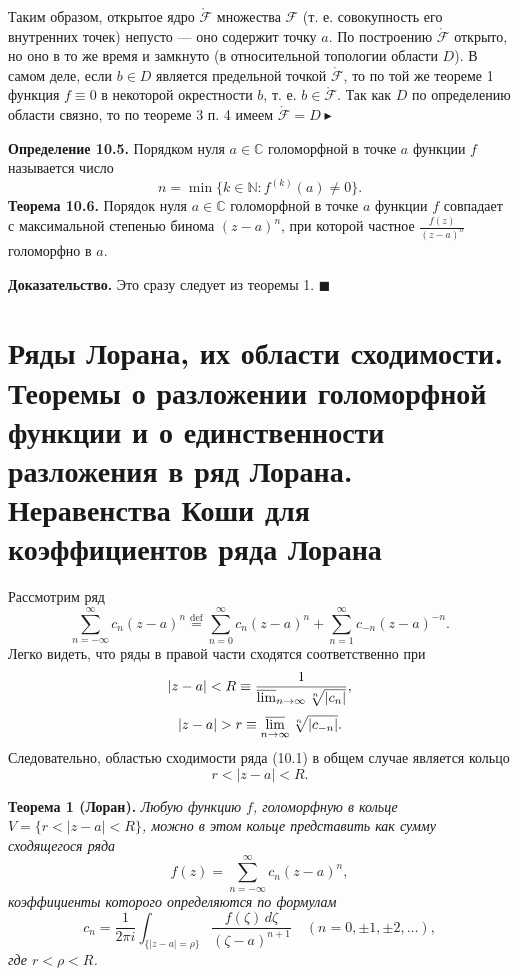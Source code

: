 \documentclass[12pt, a4paper]{article}
\theoremstyle{definition}
\theoremstyle{remark}
\begin{document}
Таким образом, открытое ядро $\mathring{\mathcal{F}}$ множества $\mathcal{F}$ (т. е. совокупность его внутренних точек) непусто — оно содержит точку $a$. По построению $\mathring{\mathcal{F}}$ открыто, но оно в то же время и замкнуто (в относительной топологии области $D$). В самом деле, если $b \in D$ является предельной точкой $\mathring{\mathcal{F}}$, то по той же теореме 1 функция $f \equiv 0$ в некоторой окрестности $b$, т. е. $b \in \mathring{\mathcal{F}}$. Так как $D$ по определению области связно, то по теореме 3 п. 4 имеем $\mathring{\mathcal{F}} = D \blacktriangleright$

\textbf{Определение 10.5.} Порядком нуля $a \in \mathbb{C}$ голоморфной в точке $a$ функции $f$ называется число
$$
n = \min\{k \in \mathbb{N} : f^{(k)}(a) \neq 0\}.
$$
\textbf{Теорема 10.6.} Порядок нуля $a \in \mathbb{C}$ голоморфной в точке $a$ функции $f$ совпадает с максимальной степенью бинома $(z - a)^n$, при которой частное $\frac{f(z)}{(z - a)^n}$ голоморфно в $a$.

\textbf{Доказательство.} Это сразу следует из теоремы 1. $\blacksquare$

\newpage
\section{Ряды Лорана, их области сходимости. Теоремы о разложении голоморфной функции и о единственности разложения в ряд Лорана. Неравенства Коши для коэффициентов ряда Лорана}
Рассмотрим ряд
\begin{equation}
	\sum_{n=-\infty}^{\infty} c_n (z - a)^n \stackrel{\text{def}}{=} \sum_{n=0}^{\infty} c_n (z - a)^n + \sum_{n=1}^{\infty} c_{-n} (z - a)^{-n}.
	\tag{10.1}
\end{equation}
Легко видеть, что ряды в правой части сходятся соответственно при
$$
|z - a| < R \equiv \frac{1}{\varlimsup_{n \to \infty} \sqrt[n]{|c_n|}},
$$
$$
|z - a| > r \equiv \varlimsup_{n \to \infty} \sqrt[n]{|c_{-n}|}.
$$
Следовательно, областью сходимости ряда (10.1) в общем случае является кольцо
$$
r < |z - a| < R.
$$

\textbf{Теорема 1 (Лоран).} \textit{Любую функцию $f$, голоморфную в кольце $V = \{r < |z - a| < R\}$, можно в этом кольце представить как сумму сходящегося ряда}
\begin{equation}
	f(z) = \sum_{n=-\infty}^{\infty} c_n (z - a)^n,
	\tag{1}
\end{equation}
\textit{коэффициенты которого определяются по формулам}
\begin{equation}
	c_n = \frac{1}{2\pi i} \int_{\{|z - a| = \rho\}} \frac{f(\zeta) \, d\zeta}{(\zeta - a)^{n+1}} \quad (n = 0, \pm 1, \pm 2, \dots),
	\tag{2}
\end{equation}
\textit{где $r < \rho < R$.}
\end{document}
